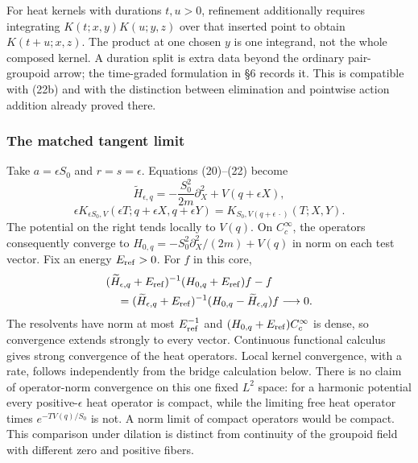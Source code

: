 \documentclass[11pt,a4paper]{article}
\begin{document}
For heat kernels with durations \(t,u>0\), refinement additionally
requires integrating \(K(t;x,y)K(u;y,z)\) over that inserted point to
obtain \(K(t+u;x,z)\). The product at one chosen \(y\) is one integrand,
not the whole composed kernel. A duration split is extra data beyond the
ordinary pair-groupoid arrow; the time-graded formulation in §6 records
it. This is compatible with (22b) and with the distinction between
elimination and pointwise action addition already proved there.

\subsubsection{The matched tangent
limit}\label{the-matched-tangent-limit}

Take \(a=\epsilon S_0\) and \(r=s=\epsilon\). Equations (20)--(22)
become \[
 \widetilde H_{\epsilon,q}
 =-\frac{S_0^2}{2m}\partial_X^2+V(q+\epsilon X),
 \tag{23a}
\] \[
 \epsilon K_{\epsilon S_0,V}
       (\epsilon T;q+\epsilon X,q+\epsilon Y)
 =K_{S_0,V(q+\epsilon\,\cdot)}(T;X,Y).
 \tag{23b}
\] The potential on the right tends locally to \(V(q)\). On
\(C_c^\infty\), the operators consequently converge to
\(H_{0,q}=-S_0^2\partial_X^2/(2m)+V(q)\) in norm on each test vector.
Fix an energy \(E_{\rm ref}>0\). For \(f\) in this core, \[
 \begin{aligned}
 &(\widetilde H_{\epsilon,q}+E_{\rm ref})^{-1}
                         (H_{0,q}+E_{\rm ref})f-f\\
 &\quad=(\widetilde H_{\epsilon,q}+E_{\rm ref})^{-1}
                 (H_{0,q}-\widetilde H_{\epsilon,q})f\longrightarrow0.
 \end{aligned}
\] The resolvents have norm at most \(E_{\rm ref}^{-1}\) and
\((H_{0,q}+E_{\rm ref})C_c^\infty\) is dense, so convergence extends
strongly to every vector. Continuous functional calculus gives strong
convergence of the heat operators. Local kernel convergence, with a
rate, follows independently from the bridge calculation below. There is
no claim of operator-norm convergence on this one fixed \(L^2\) space:
for a harmonic potential every positive-\(\epsilon\) heat operator is
compact, while the limiting free heat operator times \(e^{-TV(q)/S_0}\)
is not. A norm limit of compact operators would be compact. This
comparison under dilation is distinct from continuity of the groupoid
field with different zero and positive fibers.
\end{document}
